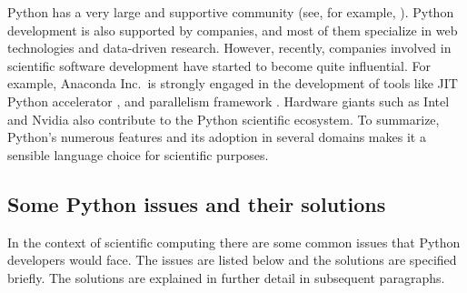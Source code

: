 Python has a very large and supportive community (see, for example,
).
%
Python development is also supported by companies, and most of them specialize
in web technologies and data-driven research. However, recently, companies
involved in scientific software development have started to become quite
influential. For example, Anaconda Inc.\ is strongly engaged in the development
of tools like JIT Python accelerator , and parallelism framework
. Hardware giants such as Intel and Nvidia also contribute to the
Python scientific ecosystem.
%
To summarize, Python's numerous features and its adoption in several domains
makes it a sensible language choice for scientific purposes.

\subsection{Some Python issues and their solutions}

In the context of scientific computing there are some common issues that Python
developers would face. The issues are listed below and the solutions are
specified briefly. The solutions are explained in further detail in subsequent
paragraphs.

